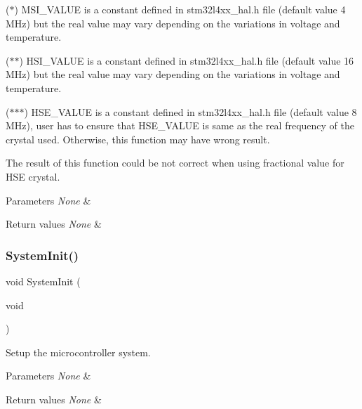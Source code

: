 ($\ast$) M\+S\+I\+\_\+\+V\+A\+L\+UE is a constant defined in stm32l4xx\+\_\+hal.\+h file (default value 4 M\+Hz) but the real value may vary depending on the variations in voltage and temperature.

($\ast$$\ast$) H\+S\+I\+\_\+\+V\+A\+L\+UE is a constant defined in stm32l4xx\+\_\+hal.\+h file (default value 16 M\+Hz) but the real value may vary depending on the variations in voltage and temperature.

($\ast$$\ast$$\ast$) H\+S\+E\+\_\+\+V\+A\+L\+UE is a constant defined in stm32l4xx\+\_\+hal.\+h file (default value 8 M\+Hz), user has to ensure that H\+S\+E\+\_\+\+V\+A\+L\+UE is same as the real frequency of the crystal used. Otherwise, this function may have wrong result.


\begin{DoxyItemize}
\item The result of this function could be not correct when using fractional value for H\+SE crystal.
\end{DoxyItemize}


\begin{DoxyParams}{Parameters}
{\em None} & \\
\hline
\end{DoxyParams}

\begin{DoxyRetVals}{Return values}
{\em None} & \\
\hline
\end{DoxyRetVals}
\mbox{\label{group__STM32L4xx__System__Private__Functions_ga93f514700ccf00d08dbdcff7f1224eb2}} 
\subsubsection{\texorpdfstring{System\+Init()}{SystemInit()}}
{\footnotesize\ttfamily void System\+Init (\begin{DoxyParamCaption}\item[{void}]{ }\end{DoxyParamCaption})}



Setup the microcontroller system. 


\begin{DoxyParams}{Parameters}
{\em None} & \\
\hline
\end{DoxyParams}

\begin{DoxyRetVals}{Return values}
{\em None} & \\
\hline
\end{DoxyRetVals}

